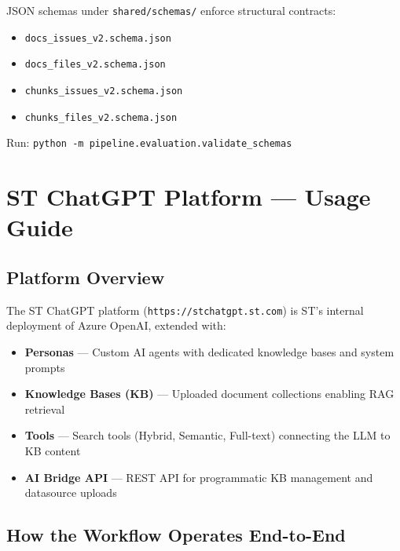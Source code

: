\documentclass[12pt,a4paper]{report}
\begin{document}
JSON schemas under \texttt{shared/schemas/} enforce structural contracts:
\begin{itemize}
  \item \texttt{docs\_issues\_v2.schema.json}
  \item \texttt{docs\_files\_v2.schema.json}
  \item \texttt{chunks\_issues\_v2.schema.json}
  \item \texttt{chunks\_files\_v2.schema.json}
\end{itemize}

Run: \texttt{python -m pipeline.evaluation.validate\_schemas}

\chapter{ST ChatGPT Platform --- Usage Guide}

\section{Platform Overview}

The ST ChatGPT platform (\texttt{https://stchatgpt.st.com}) is ST's internal deployment of Azure OpenAI, extended with:
\begin{itemize}
  \item \textbf{Personas} --- Custom AI agents with dedicated knowledge bases and system prompts
  \item \textbf{Knowledge Bases (KB)} --- Uploaded document collections enabling RAG retrieval
  \item \textbf{Tools} --- Search tools (Hybrid, Semantic, Full-text) connecting the LLM to KB content
  \item \textbf{AI Bridge API} --- REST API for programmatic KB management and datasource uploads
\end{itemize}

\section{How the Workflow Operates End-to-End}
\end{document}
